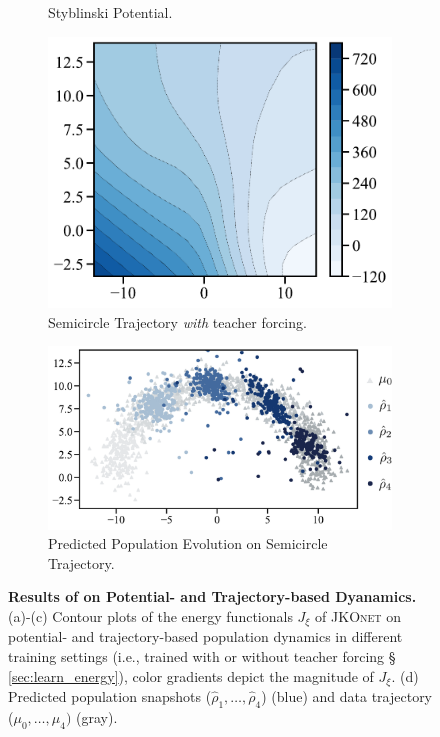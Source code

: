\begin{figure}[t]
\begin{subfigure}[t]{0.21\textwidth}
         \caption{Styblinski \protect\newline Potential.}
     \end{subfigure}
     \hfill
     \begin{subfigure}[t]{0.22\textwidth}
         \centering
         \includegraphics[width=\textwidth]{figures/fig_energy_implicit_semicircle_tf.pdf}
         \caption{Semicircle \protect\newline Trajectory \emph{with} teacher forcing.}
     \end{subfigure}
     \hfill
     \begin{subfigure}[t]{0.33\textwidth}
         \centering
         \includegraphics[width=\textwidth]{figures/fig_prediction_implicit_semicircle_tf.pdf}
         \caption{Predicted Population \protect\newline Evolution on Semicircle Trajectory.}
     \end{subfigure}
	 \caption{\textbf{Results of  on Potential- and Trajectory-based Dyanamics.} (a)-(c) Contour plots of the energy functionals $J_\xi$ of \textsc{JKOnet} on potential- and trajectory-based population dynamics in different training settings (i.e., trained with or without teacher forcing \S~ \ref{sec:learn_energy}), color gradients depict the magnitude of $J_\xi$. (d) Predicted population snapshots ($\hat{\rho}_1, \dots, \hat{\rho}_4$) (blue) and data trajectory ($\mu_0, \dots, \mu_4)$ (gray).}
	 \label{fig:exp_jkonet_pot_traj}
\end{figure}



